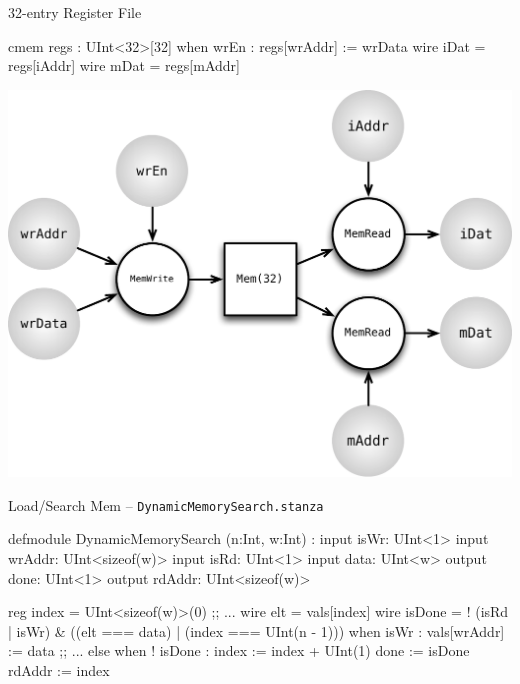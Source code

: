 \documentclass[xcolor=pdflatex,dvipsnames,table]{beamer}
\begin{document}
\begin{frame}[fragile]{32-entry Register File}

\begin{stanza}
cmem regs : UInt<32>[32]
when wrEn :
  regs[wrAddr] := wrData
wire iDat = regs[iAddr]
wire mDat = regs[mAddr]
\end{stanza}

\begin{center}
\includegraphics[height=0.55\textheight]{figs/mem.pdf} 
\end{center}

\end{frame}

\begin{frame}[fragile]{Load/Search Mem -- \tt DynamicMemorySearch.stanza}
\begin{stanza}
defmodule DynamicMemorySearch (n:Int, w:Int) :
  input  isWr:   UInt<1>
  input  wrAddr: UInt<sizeof(w)>
  input  isRd:   UInt<1>
  input  data:   UInt<w>
  output done:   UInt<1>
  output rdAddr: UInt<sizeof(w)>

  reg index = UInt<sizeof(w)>(0)
  ;; ...
  wire elt  = vals[index]
  wire isDone = ! (isRd | isWr) & ((elt === data) | (index === UInt(n - 1)))
  when isWr :
    vals[wrAddr] := data
  ;; ...
  else when ! isDone :
    index := index + UInt(1)
  done    := isDone
  rdAddr  := index
\end{stanza}
\end{frame}
\end{document}
